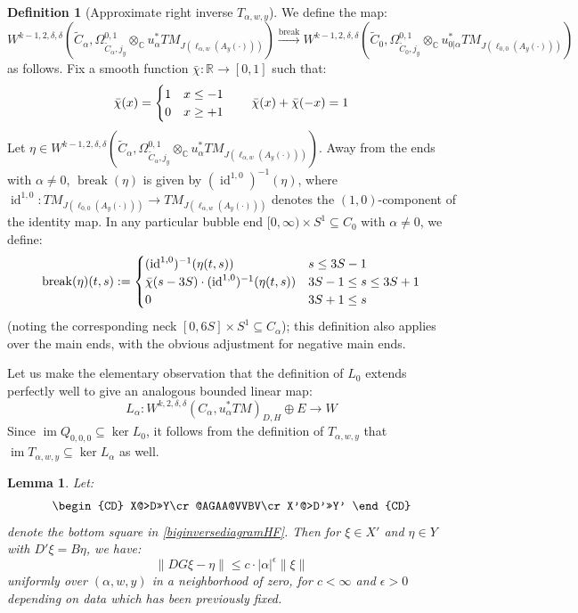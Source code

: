 \documentclass[12pt]{article}
\newtheorem{lemma}[theorem]{Lemma}
\theoremstyle{definition}
\newtheorem{definition}[theorem]{Definition}
\theoremstyle{remark}
\numberwithin{equation}{subsection}
\newcommand{\CC}{\mathbb C}
\newcommand{\RR}{\mathbb R}
\newcommand{\im}{\operatorname{im}}
\newcommand{\id}{\operatorname{id}}
\begin{document}
\begin{definition}[Approximate right inverse $T_{\alpha,w,y}$]
We define the map:
\begin{equation}
W^{k-1,2,\delta,\delta}(\tilde C_\alpha,\Omega^{0,1}_{\tilde C_\alpha,j_y}\otimes_\CC u_\alpha^\ast TM_{J(\ell_{\alpha,w}(A_y(\cdot)))})\xrightarrow{\mathrm{break}}W^{k-1,2,\delta,\delta}(\tilde C_0,\Omega^{0,1}_{\tilde C_0,j_y}\otimes_\CC u_{0|\alpha}^\ast TM_{J(\ell_{0,0}(A_y(\cdot)))})
\end{equation}
as follows.  Fix a smooth function $\bar\chi:\RR\to[0,1]$ such that:
\begin{equation}
\bar\chi(x)=\begin{cases}1&x\leq-1\cr0&x\geq+1\end{cases}\qquad\bar\chi(x)+\bar\chi(-x)=1
\end{equation}
Let $\eta\in W^{k-1,2,\delta,\delta}(\tilde C_\alpha,\Omega^{0,1}_{\tilde C_\alpha,j_y}\otimes_\CC u_\alpha^\ast TM_{J(\ell_{\alpha,w}(A_y(\cdot)))})$.  Away from the ends with $\alpha\ne 0$, $\operatorname{break}(\eta)$ is given by $(\id^{1,0})^{-1}(\eta)$, where $\id^{1,0}:TM_{J(\ell_{0,0}(A_y(\cdot)))}\to TM_{J(\ell_{\alpha,w}(A_y(\cdot)))}$ denotes the $(1,0)$-component of the identity map.  In any particular bubble end $[0,\infty)\times S^1\subseteq C_0$ with $\alpha\ne 0$, we define:
\begin{equation}
\operatorname{break}(\eta)(t,s):=\begin{cases}
(\id^{1,0})^{-1}(\eta(t,s))&s\leq 3S-1\cr
\bar\chi(s-3S)\cdot(\id^{1,0})^{-1}(\eta(t,s))&3S-1\leq s\leq 3S+1\cr
0&3S+1\leq s
\end{cases}
\end{equation}
(noting the corresponding neck $[0,6S]\times S^1\subseteq C_\alpha$); this definition also applies over the main ends, with the obvious adjustment for negative main ends.
\end{definition}

Let us make the elementary observation that the definition of $L_0$ extends perfectly well to give an analogous bounded linear map:
\begin{equation}\label{newLonpregluedHF}
L_\alpha:W^{k,2,\delta,\delta}(C_\alpha,u_\alpha^\ast TM)_{D,H}\oplus E\to W
\end{equation}
Since $\im Q_{0,0,0}\subseteq\ker L_0$, it follows from the definition of $T_{\alpha,w,y}$ that $\im T_{\alpha,w,y}\subseteq\ker L_\alpha$ as well.

\begin{lemma}\label{approxbottomHF}
Let:
\begin{equation}
\begin{CD}
X@>D>>Y\cr
@AGAA@VVBV\cr
X'@>D'>>Y'
\end{CD}
\end{equation}
denote the bottom square in \eqref{biginversediagramHF}.  Then for $\xi\in X'$ and $\eta\in Y$ with $D'\xi=B\eta$, we have:
\begin{equation}
\left\|DG\xi-\eta\right\|\leq c\cdot\left|\alpha\right|^\epsilon\left\|\xi\right\|
\end{equation}
uniformly over $(\alpha,w,y)$ in a neighborhood of zero, for $c<\infty$ and $\epsilon>0$ depending on data which has been previously fixed.
\end{lemma}
\end{document}
